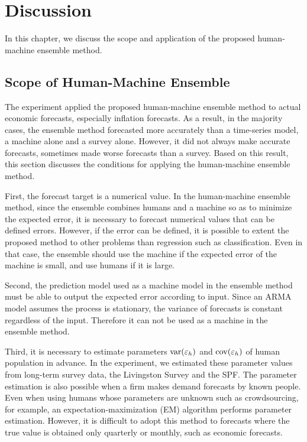 \documentclass[../main.tex]{subfiles}
\begin{document}
\section{Discussion}
\label{sec: Discussion}

In this chapter, we discuss the scope and application of the proposed human-machine ensemble method.

\subsection{Scope of Human-Machine Ensemble}

The experiment applied the proposed human-machine ensemble method to actual economic forecasts, especially inflation forecasts.
As a result, in the majority cases, the ensemble method forecasted more accurately than a time-series model, a machine alone and a survey alone.
However, it did not always make accurate forecasts, sometimes made worse forecasts than a survey.
Based on this result, this section discusses the conditions for applying the human-machine ensemble method.

First, the forecast target is a numerical value.
In the human-machine ensemble method, since the ensemble combines humans and a machine so as to minimize the expected error, it is necessary to forecast numerical values that can be defined errors.
However, if the error can be defined, it is possible to extent the proposed method to other problems than regression such as classification.
Even in that case, the ensemble should use the machine if the expected error of the machine is small, and use humans if it is large.

Second, the prediction model used as a machine model in the ensemble method must be able to output the expected error according to input.
Since an ARMA model assumes the process is stationary, the variance of forecasts is constant regardless of the input.
Therefore it can not be used as a machine in the ensemble method.

Third, it is necessary to estimate parameters $\operatorname{var}(\varepsilon_h)$ and $\operatorname{cov}(\varepsilon_h)$ of human population in advance.
In the experiment, we estimated these parameter values from long-term survey data, the Livingston Survey and the SPF\@.
The parameter estimation is also possible when a firm makes demand forecasts by known people.
Even when using humans whose parameters are unknown such as crowdsourcing, for example, an expectation-maximization (EM) algorithm performs parameter estimation.
However, it is difficult to adopt this method to forecasts where the true value is obtained only quarterly or monthly, such as economic forecasts.
\end{document}
